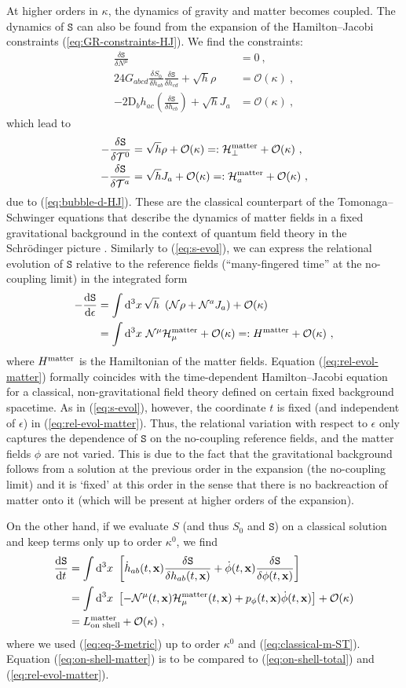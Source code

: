 \documentclass[12pt]{iopart}
\def\eq#1{\begin{equation}\begin{aligned}#1\end{aligned}\end{equation}}
\def\eref#1{(\ref{eq:#1})}
\def\D{\mathrm{d}}
\def\Del#1#2{\frac{\D#1}{\D#2}}
\def\S{\mathtt{S}}
\def\Ob{\mathcal{O}}
\def\N{\mathcal{N}}
\def\x{\mathbf{x}}
\def\T{\mathcal{T}}
\begin{document}
At higher orders in $\kappa$, the dynamics of gravity and matter becomes coupled. The dynamics of $\S$ can also be found from the expansion of the Hamilton--Jacobi constraints \eref{GR-constraints-HJ}. We find the constraints:
\eq{\label{eq:Stt-HJ}
\frac{\delta\S}{\delta N^{\mu}} &= 0 \ , \\
24G_{abcd}\frac{\delta S_0}{\delta h_{ab}}\frac{\delta \S}{\delta h_{cd}}+\sqrt{h}\rho &= \Ob(\kappa) \ ,\\
-2\mathrm{D}_b h_{ac}\left(\frac{\delta \S}{\delta h_{cb}}\right)+\sqrt{h}J_a &= \Ob(\kappa) \ ,
}
which lead to
\eq{\label{eq:classical-m-ST}
-\frac{\delta\S}{\delta\T^0} &= \sqrt{h}\rho+\Ob(\kappa) =: \mathcal{H}_{\perp}^{\rm matter}+\Ob(\kappa) \ ,\\
-\frac{\delta\S}{\delta\T^{a}} &=\sqrt{h}J_a+\Ob(\kappa)=: \mathcal{H}_{a}^{\rm matter} +\Ob(\kappa) \ ,
}
due to \eref{bubble-d-HJ}. These are the classical counterpart of the Tomonaga--Schwinger equations that describe the dynamics of matter fields in a fixed gravitational background in the context of quantum field theory in the Schr\"odinger picture \citep{Tomonaga:1946zz,Schwinger:1948yk,Jackiw:1995be,Torre:1998eq}. Similarly to \eref{s-evol}, we can express the relational evolution of $\S$ relative to the reference fields (``many-fingered time'' at the no-coupling limit) in the integrated form
\eq{\label{eq:rel-evol-matter}
-\Del{\S}{\epsilon} &= \int\D^3x\,\sqrt{h}\ \left(\N\rho+\N^aJ_a\right)+\Ob(\kappa)\\
& = \int\D^3x\ \N^{\mu}\mathcal{H}^{\rm matter}_{\mu}+\Ob(\kappa) =: H^{\rm matter}+\Ob(\kappa) \ ,
}
where $H^{\rm matter}$ is the Hamiltonian of the matter fields. Equation \eref{rel-evol-matter} formally coincides with the time-dependent Hamilton--Jacobi equation for a classical, non-gravitational field theory defined on certain fixed background spacetime. As in \eref{s-evol}, however, the coordinate $t$ is fixed (and independent of $\epsilon$) in \eref{rel-evol-matter}. Thus, the relational variation with respect to $\epsilon$ only captures the dependence of $\S$ on the no-coupling reference fields, and the matter fields $\phi$ are not varied. This is due to the fact that the gravitational background follows from a solution at the previous order in the expansion (the no-coupling limit) and it is `fixed' at this order in the sense that there is no backreaction of matter onto it (which will be present at higher orders of the expansion).

On the other hand, if we evaluate $S$ (and thus $S_0$ and $\S$) on a classical solution and keep terms only up to order $\kappa^0$, we find
\eq{\label{eq:on-shell-matter}
\Del{\S}{t} &= \int\D^3x\ \left[\dot{h}_{ab}(t,\x)\frac{\delta \S}{\delta h_{ab}(t,\x)} +\dot{\phi}(t,\x)\frac{\delta \S}{\delta\phi(t,\x)}\right]\\
&= \int\D^3x\ \left[-\N^{\mu}(t,\x)\mathcal{H}^{\rm matter}_{\mu}(t,\x) + p_\phi(t,\x)\dot{\phi}(t,\x)\right]+\Ob(\kappa)\\
&= L_{\text{on shell}}^{\text{matter}} +\Ob(\kappa) \ ,
}
where we used \eref{eq-3-metric} up to order $\kappa^0$ and \eref{classical-m-ST}. Equation \eref{on-shell-matter} is to be compared to \eref{on-shell-total} and \eref{rel-evol-matter}.
\end{document}

